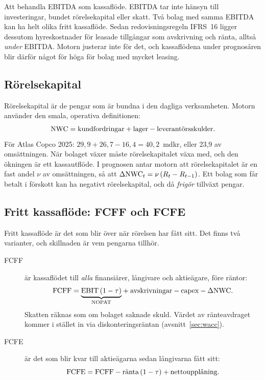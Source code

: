 \begin{vanligtfel}
Att behandla EBITDA som kassaflöde. EBITDA tar inte hänsyn till investeringar, bundet
rörelsekapital eller skatt. Två bolag med samma EBITDA kan ha helt olika fritt kassaflöde.
Sedan redovisningsregeln IFRS~16 ligger dessutom hyreskostnader för leasade tillgångar som
avskrivning och ränta, alltså \emph{under} EBITDA. Motorn justerar inte för det, och
kassaflödena under prognosåren blir därför något för höga för bolag med mycket leasing.
\end{vanligtfel}

\subsection{Rörelsekapital}

Rörelsekapital  är de pengar som är bundna i den dagliga
verksamheten. Motorn använder den smala, operativa definitionen:
\begin{equation}
  \mathrm{NWC} = \text{kundfordringar} + \text{lager} - \text{leverantörsskulder}.
  \label{eq:nwc}
\end{equation}
För Atlas Copco 2025: $29,9 + 26,7 - 16,4 = 40,2$~mdkr, eller 23,9\pct{} av omsättningen. När
bolaget växer måste rörelsekapitalet växa med, och den ökningen är ett kassautflöde. I prognosen
antar motorn att rörelsekapitalet är en fast andel $\nu$ av omsättningen, så att
$\Delta\mathrm{NWC}_t = \nu\,(R_t - R_{t-1})$. Ett bolag som får betalt i förskott kan ha negativt
rörelsekapital, och då \emph{frigör} tillväxt pengar.

\subsection{Fritt kassaflöde: FCFF och FCFE}

Fritt kassaflöde är det som blir över när rörelsen har fått sitt. Det finns två varianter, och
skillnaden är vem pengarna tillhör.

\begin{description}
  \item[FCFF]  är kassaflödet till
    \emph{alla} finansiärer, långivare och aktieägare, före räntor:
    \begin{equation}
      \mathrm{FCFF} = {\underbrace{\mathrm{EBIT}\,(1-\tau)}_{\mathrm{NOPAT}}} + \text{avskrivningar} - \text{capex}
              - \Delta\mathrm{NWC} .
      \label{eq:fcff}
    \end{equation}
    Skatten räknas som om bolaget saknade skuld. Värdet av ränteavdraget kommer i stället in via
    diskonteringsräntan (avsnitt~\ref{sec:wacc}).
  \item[FCFE]  är det som blir kvar till
    aktieägarna sedan långivarna fått sitt:
    \begin{equation}
      \mathrm{FCFE} = \mathrm{FCFF} - \text{ränta}\,(1-\tau) + \text{nettoupplåning}.
      \label{eq:fcfe}
    \end{equation}
\end{description}

